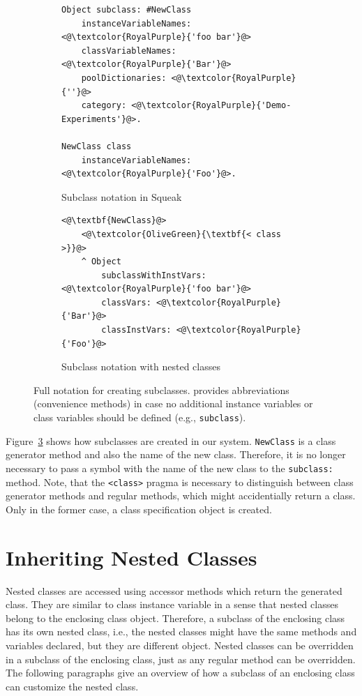 \begin{figure}[!htp]
\begin{subfigure}[b]{\textwidth}
\begin{lstlisting}
Object subclass: #NewClass
    instanceVariableNames: <@\textcolor{RoyalPurple}{'foo bar'}@>
    classVariableNames: <@\textcolor{RoyalPurple}{'Bar'}@>
    poolDictionaries: <@\textcolor{RoyalPurple}{''}@>
    category: <@\textcolor{RoyalPurple}{'Demo-Experiments'}@>.

NewClass class
	instanceVariableNames: <@\textcolor{RoyalPurple}{'Foo'}@>.
\end{lstlisting}
\caption{Subclass notation in Squeak}
\label{fig:impl_subclass_squeak}
\end{subfigure}

\vspace{15pt}

\begin{subfigure}[b]{\textwidth}
\begin{lstlisting}
<@\textbf{NewClass}@>
    <@\textcolor{OliveGreen}{\textbf{< class >}}@>
    ^ Object 
        subclassWithInstVars: <@\textcolor{RoyalPurple}{'foo bar'}@>
        classVars: <@\textcolor{RoyalPurple}{'Bar'}@>
        classInstVars: <@\textcolor{RoyalPurple}{'Foo'}@>
\end{lstlisting}
\caption{Subclass notation with nested classes}
\label{fig:impl_subclass_nested}
\end{subfigure}
\caption[Notation for creating subclasses]{Full notation for creating subclasses. \msname provides abbreviations (convenience methods) in case no additional instance variables or class variables should be defined (e.g., \texttt{subclass}).}
\end{figure}

Figure~\ref{fig:impl_subclass_nested} shows how subclasses are created in our system. \texttt{NewClass} is a class generator method and also the name of the new class. Therefore, it is no longer necessary to pass a symbol with the name of the new class to the \texttt{subclass:} method. Note, that the \texttt{<class>} pragma is necessary to distinguish between class generator methods and regular methods, which might accidentially return a class. Only in the former case, a class specification object is created.

\section{Inheriting Nested Classes}
Nested classes are accessed using accessor methods which return the generated class. They are similar to class instance variable in a sense that nested classes belong to the enclosing class object. Therefore, a subclass of the enclosing class has its own nested class, i.e., the nested classes might have the same methods and variables declared, but they are different object. Nested classes can be overridden in a subclass of the enclosing class, just as any regular method can be overridden. The following paragraphs give an overview of how a subclass of an enclosing class can customize the nested class.

